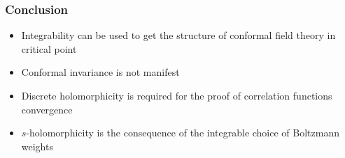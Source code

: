 \documentclass[pdftex]{beamer}
\theoremstyle{definition} \newtheorem{Def}{Definition}
\begin{document}
\begin{frame}
  \frametitle{ Conclusion}
  \begin{itemize}
  \item Integrability can be used to get the structure of conformal field theory in critical point
  \item Conformal invariance is not manifest
  \item Discrete holomorphicity is required for the proof of correlation functions convergence
  \item $s$-holomorphicity is the consequence of the integrable choice of Boltzmann weights
  \end{itemize}
\end{frame}
{} 

\end{document}
